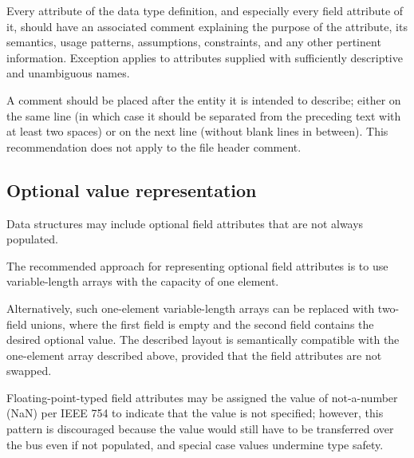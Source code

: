 Every attribute of the data type definition, and especially every field attribute of it,
should have an associated comment explaining the purpose of the attribute, its semantics, usage patterns,
assumptions, constraints, and any other pertinent information.
Exception applies to attributes supplied with sufficiently descriptive and unambiguous names.

A comment should be placed after the entity it is intended to describe;
either on the same line (in which case it should be separated from the preceding text with at least two spaces)
or on the next line (without blank lines in between).
This recommendation does not apply to the file header comment.


\subsection{Optional value representation}

Data structures may include optional field attributes that are not always populated.

The recommended approach for representing optional field attributes
is to use variable-length arrays with the capacity of one element.

Alternatively, such one-element variable-length arrays can be replaced with two-field unions,
where the first field is empty and the second field contains the desired optional value.
The described layout is semantically compatible with the one-element array described above,
provided that the field attributes are not swapped.

Floating-point-typed field attributes may be assigned the value of not-a-number (NaN) per IEEE 754
to indicate that the value is not specified;
however, this pattern is discouraged because the value would still have to be transferred over the bus
even if not populated, and special case values undermine type safety.

